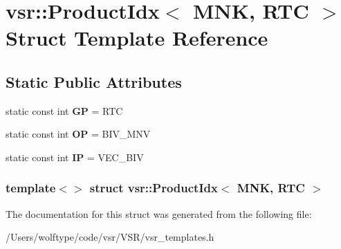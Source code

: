 \hypertarget{structvsr_1_1_product_idx_3_01_m_n_k_00_01_r_t_c_01_4}{\section{vsr\-:\-:Product\-Idx$<$ M\-N\-K, R\-T\-C $>$ Struct Template Reference}
\label{structvsr_1_1_product_idx_3_01_m_n_k_00_01_r_t_c_01_4}
}
\subsection*{Static Public Attributes}
\begin{DoxyCompactItemize}
\item 
\hypertarget{structvsr_1_1_product_idx_3_01_m_n_k_00_01_r_t_c_01_4_a8857f120917ca79d5399beeb88ecbe4a}{static const int {\bfseries G\-P} = R\-T\-C}\label{structvsr_1_1_product_idx_3_01_m_n_k_00_01_r_t_c_01_4_a8857f120917ca79d5399beeb88ecbe4a}

\item 
\hypertarget{structvsr_1_1_product_idx_3_01_m_n_k_00_01_r_t_c_01_4_ae68cd58f41faa40e4ea91b6ca39c3365}{static const int {\bfseries O\-P} = B\-I\-V\-\_\-\-M\-N\-V}\label{structvsr_1_1_product_idx_3_01_m_n_k_00_01_r_t_c_01_4_ae68cd58f41faa40e4ea91b6ca39c3365}

\item 
\hypertarget{structvsr_1_1_product_idx_3_01_m_n_k_00_01_r_t_c_01_4_a83c08ea37d89d7e69e1f4a3d7aff137b}{static const int {\bfseries I\-P} = V\-E\-C\-\_\-\-B\-I\-V}\label{structvsr_1_1_product_idx_3_01_m_n_k_00_01_r_t_c_01_4_a83c08ea37d89d7e69e1f4a3d7aff137b}

\end{DoxyCompactItemize}
\subsubsection*{template$<$$>$ struct vsr\-::\-Product\-Idx$<$ M\-N\-K, R\-T\-C $>$}



The documentation for this struct was generated from the following file\-:\begin{DoxyCompactItemize}
\item 
/\-Users/wolftype/code/vsr/\-V\-S\-R/vsr\-\_\-templates.\-h\end{DoxyCompactItemize}
